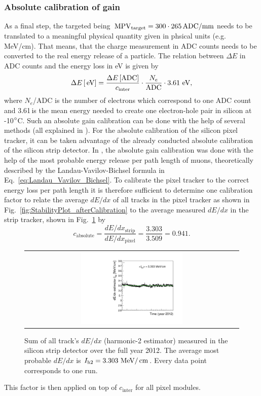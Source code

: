 \subsubsection*{Absolute calibration of gain}
As a final step, the targeted \mpv being $\,\text{MPV}_{\text{target}}=300 \cdot 265 \,  \text{ADC/mm}$ needs to be translated to a meaningful physical quantity given in phsical units (e.g. MeV/cm).
That means, that the charge measurement in ADC counts needs to be converted to the real energy release of a particle.
The relation between $\Delta E$ in ADC counts and the energy loss in eV is given by
\begin{equation*}
\Delta E\,[\,\text{e}\kern-0.06667em\text{V}] = \frac{\Delta E\,[\text{ADC}]}{c_{\text{inter}}} \cdot \frac{N_e}{\text{ADC}} \cdot 3.61 \, \,\text{e}\kern-0.06667em\text{V},
\end{equation*}
where $N_e$/ADC is the number of electrons which correspond to one ADC count and 3.61\,\ev is the  mean energy needed to create one electron-hole pair in silicon at -10$\degree$C.
Such an absolute gain calibration can be done with the help of several methods (all explained in \cite{bib:Quertenmont_2010}).
For the absolute calibration of the silicon pixel tracker, it can be taken advantage of the already conducted absolute calibration of the silicon strip detector.
In \cite{bib:Quertenmont_2010}, the absolute gain calibration was done with the help of the most probable energy release per path length of muons, 
theoretically described by the Landau-Vavilov-Bichsel formula in Eq.~\ref{eq:Landau_Vavilov_Bichsel}.  
To calibrate the pixel tracker to the correct energy loss per path length it is therefore sufficient to determine one calibration factor to relate the average $dE/dx$ of all tracks in the pixel tracker as shown in 
Fig.~\ref{fig:StabilityPlot_afterCalibration} to the average measured $dE/dx$ in the strip tracker, shown in Fig.~\ref{fig:StabilityPlot_Strip} by
\begin{equation*}
c_{\text{absolute}} = \frac{dE/dx_{\text{strip}}}{dE/dx_{\text{pixel}}} = \frac{3.303}{3.509} = 0.941.
\end{equation*}
\begin{figure}[!bt]
  \centering 
  \begin{tabular}{c}
  \includegraphics[width=0.49\textwidth]{figures/analysis/StabilityPlot_Strip_afterCalibration_withoutStepFits_NEW.pdf}
  \end{tabular}
  \caption{Sum of all track's $dE/dx$ (harmonic-2 estimator) measured in the silicon strip detector over the full year 2012. The average most probable $dE/dx$ is $I_{\text{h2}}=3.303\,\,\text{Me}\kern-0.06667em\text{V}/\,\text{cm}$. Every data point corresponds to one run.} 
  \label{fig:StabilityPlot_Strip}
\end{figure}
This factor is then applied on top of $c_{\text{inter}}$ for all pixel modules.

